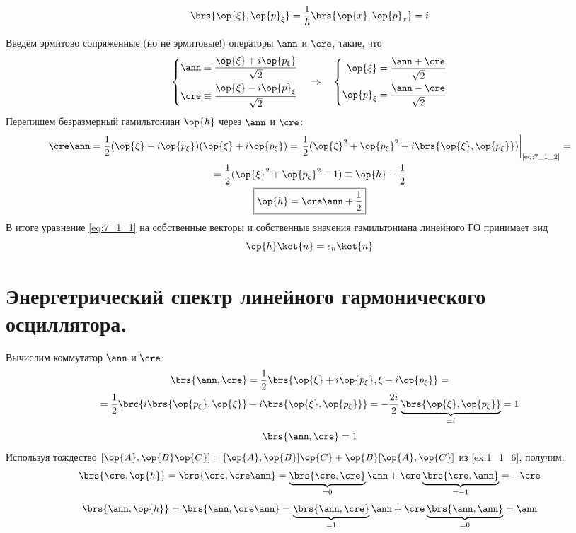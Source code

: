\begin{equation}
\label{eq:7_1_2}
\brs{\op{\xi}, \op{p}_\xi} = \frac{1}{\hbar} \brs{\op{x}, \op{p}_x} = i
\end{equation}

Введём эрмитово сопряжённые (но не эрмитовые!) операторы $\ann$ и $\cre$, такие, что
$$
\left\{
\begin{aligned}
\ann \equiv \frac{\op{\xi} + i\op{p_\xi}}{\sqrt{2}} \\
\cre \equiv \frac{\op{\xi} - i\op{p}_\xi}{\sqrt{2}}
\end{aligned}
\right. ~~~ \Rightarrow ~~~ \left\{
\begin{aligned}
\op{\xi} = \frac{\ann + \cre}{\sqrt{2}} \\
\op{p}_\xi = \frac{\ann - \cre}{\sqrt{2}} \\
\end{aligned} \right.
$$%
%
Перепишем безразмерный гамильтониан $\op{h}$ через $\ann$ и $\cre$:
$$
\begin{gathered}
\cre\ann = \frac{1}{2} (\op{\xi} - i\op{p_\xi})(\op{\xi} + i\op{p_\xi}) = \left. \frac{1}{2}(\op{\xi}^2 + \op{p_\xi}^2 + i \brs{\op{\xi}, \op{p_\xi}}) \right|_{\text{\eqref{eq:7_1_2}}} =\\= \frac{1}{2} (\op{\xi}^2 + \op{p_\xi}^2 - 1) \equiv \op{h} - \frac{1}{2}
\\
\boxed{
  \op{h} = \cre\ann + \frac{1}{2}
}
\end{gathered}
$$%
%
В итоге уравнение \eqref{eq:7_1_1} на собственные векторы и собственные значения гамильтониана линейного ГО принимает вид
\begin{equation}
\label{eq:7_1_3}
\op{h} \ket{n} = \epsilon_n \ket{n}
\end{equation}

\section{Энергетрический спектр линейного гармонического осциллятора.}

Вычислим коммутатор $\ann$ и $\cre$:
$$
\begin{gathered}
\brs{\ann, \cre} = \frac{1}{2} \brs{ \op{\xi} + i\op{p_\xi},  \xi - i\op{p_\xi}} =\\= \frac{1}{2} \brc{ i\brs{\op{p_\xi}, \op{\xi}} - i \brs{\op{\xi}, \op{p_\xi}} } = -\frac{2i}{2} \underbrace{ \brs{\op{\xi}, \op{p_\xi}}}_{= i} = 1
\end{gathered}
$$
\begin{equation}
\label{eq:7_2_1}
\brs{\ann, \cre} = 1
\end{equation}%
%
Используя тождество $[\op{A}, \op{B}\op{C}] = [\op{A}, \op{B}] \op{C} + \op{B} [\op{A}, \op{C}]$ из \cref{ex:1_1_6}, получим:
\begin{equation}
\label{eq:7_2_2}
\brs{\cre, \op{h}} = \brs{\cre, \cre\ann} = \underbrace{\brs{\cre, \cre}}_{= 0} \ann + \cre \underbrace{\brs{\cre, \ann}}_{= -1} = - \cre
\end{equation}%
%
\begin{equation}
\label{eq:7_2_3}
\brs{\ann, \op{h}} = \brs{\ann, \cre\ann} = \underbrace{\brs{\ann, \cre}}_{= 1} \ann + \cre \underbrace{\brs{\ann, \ann}}_{= 0} = \ann
\end{equation}


